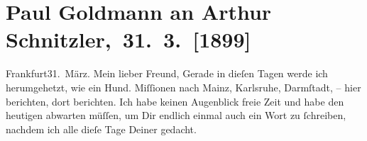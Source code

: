 

         
         \renewcommand{\erwaehntePersonen}{Personen: Leo Feld, Paul Goldmann, Clementine Goldmann, Carl Karlweis, Fedor Mamroth, Marie Reinhard, Josef Rosengart, Vally Rosengart, Ferdinand von Saar}
         \renewcommand{\erwaehnteInstitutionen}{Institutionen: Bauernfeld-Preis}
         \renewcommand{\erwaehnteOrte}{Orte: Darmstadt, Frankfurt am Main, Karlsruhe, Mainz, Wien, Wiesbaden}
         \renewcommand{\erwaehnteWerke}{}
               \section[ Paul Goldmann an Arthur Schnitzler, 31. 3. {[}1899{]}]{ Paul Goldmann an Arthur Schnitzler, 31. 3. {[}1899{]}}\nopagebreak{}\rehead{ }\begin{ledgroupsized}[t]{13cm}\normalsize\beginnumbering{} \toendnotes[C]{\smallbreak\pagebreak[2]} 
\toendnotes[C]{\smallbreak}\pstart
           \raggedleft{}{\pb}Frankfurt31. März.\pend
           \pstart\center{}Mein lieber Freund,\pend\pstart
           Gerade in dieſen Tagen werde ich herumgehetzt, wie ein Hund. Miſſionen nach Mainz, Karlsruhe, Darmſtadt, – hier berichten,
               dort berichten. Ich habe keinen Augenblick freie Zeit und habe den heutigen \label{K_L02871-1v}\label{K_L02871-1h} abwarten müſſen, um Dir endlich einmal auch ein Wort zu ſchreiben, nachdem
               ich \strikeout{\textcolor{gray}{×}\-\textcolor{gray}{×}\-\textcolor{gray}{×}} alle dieſe Tage \strikeout{\textcolor{gray}{×}\-\textcolor{gray}{×}\-\textcolor{gray}{×}}{ }\label{K_L02871-2v}\label{K_L02871-2h} Deiner gedacht.\pend
           \pstart

\end{ledgroupsized}
